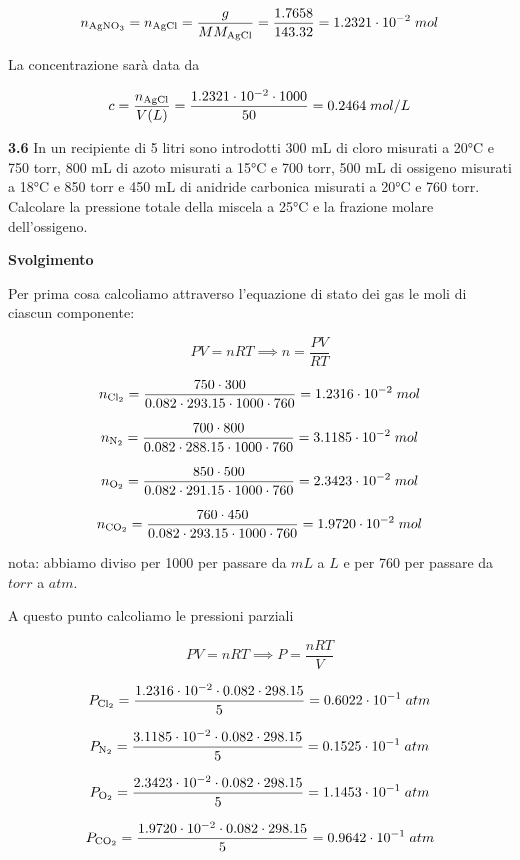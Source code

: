 $$n_{\rm AgNO_3}=n_{\rm AgCl}=\frac{g}{MM_{\rm AgCl}}
=\frac{1.7658}{143.32}=1.2321 \cdot 10^{-2}\;mol$$

La concentrazione sarà data da

$$c=\frac{n_{\rm AgCl}}{V(L)}
=\frac{1.2321 \cdot 10^{-2} \cdot 1000}{50}
=0.2464\;mol/L$$

\vspace{0.2cm}\textbf{3.6} In un recipiente di 5 litri sono introdotti 300 mL di cloro misurati a 20°C e 750 torr, 800 mL di azoto misurati a 15°C e 700 torr, 500 mL di ossigeno misurati a 18°C e 850 torr e 450 mL di anidride carbonica misurati a 20°C e 760 torr. Calcolare la pressione totale della miscela a 25°C e la frazione molare dell'ossigeno.

\vspace{0.2cm}\large\textbf{Svolgimento}\normalsize

\vspace{0.2cm}Per prima cosa calcoliamo attraverso l'equazione di stato dei gas le moli di ciascun componente:

$$PV=nRT \implies n=\frac{PV}{RT}$$

$$n_{\rm Cl_2}=\frac{750 \cdot 300}{0.082 \cdot 293.15 \cdot 1000 \cdot 760}=1.2316 \cdot 10^{-2}\;mol$$

$$n_{\rm N_2}=\frac{700 \cdot 800}{0.082 \cdot 288.15 \cdot 1000 \cdot 760}=3.1185 \cdot 10^{-2}\;mol$$

$$n_{\rm O_2}=\frac{850 \cdot 500}{0.082 \cdot 291.15 \cdot 1000 \cdot 760}=2.3423 \cdot 10^{-2}\;mol$$

$$n_{\rm CO_2}=\frac{760 \cdot 450}{0.082 \cdot 293.15 \cdot 1000 \cdot 760}=1.9720 \cdot 10^{-2}\;mol$$

nota: abbiamo diviso per 1000 per passare da $mL$ a $L$ e per 760 per passare da $torr$ a $atm$.

A questo punto calcoliamo le pressioni parziali

$$PV=nRT \implies P=\frac{nRT}{V}$$

$$P_{\rm Cl_2}=\frac{1.2316 \cdot 10^{-2} \cdot 0.082 \cdot 298.15}{5}=0.6022 \cdot 10^{-1}\;atm$$

$$P_{\rm N_2}=\frac{3.1185 \cdot 10^{-2} \cdot 0.082 \cdot 298.15}{5}=0.1525 \cdot 10^{-1}\;atm$$

$$P_{\rm O_2}=\frac{2.3423 \cdot 10^{-2} \cdot 0.082 \cdot 298.15}{5}=1.1453 \cdot 10^{-1}\;atm$$

$$P_{\rm CO_2}=\frac{1.9720 \cdot 10^{-2} \cdot 0.082 \cdot 298.15}{5}=0.9642 \cdot 10^{-1}\;atm$$

